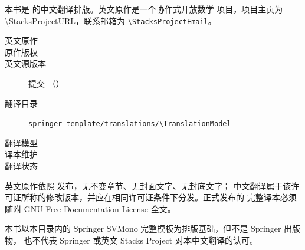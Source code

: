 
\noindent
本书是 \StacksProjectName{} 的中文翻译排版。英文原作是一个协作式开放数学
项目，项目主页为 \url{\StacksProjectURL}，联系邮箱为
\href{mailto:\StacksProjectEmail}{\nolinkurl{\StacksProjectEmail}}。

\begin{description}
  \item[英文原作] \StacksOriginalAuthor
  \item[原作版权] \StacksOriginalCopyright
  \item[英文源版本] 提交 \texttt{\StacksSourceRevision}（\StacksSourceDate）
  \item[翻译目录] \nolinkurl{springer-template/translations/\TranslationModel}
  \item[翻译模型] \TranslationModelName
  \item[译本维护] \TranslationMaintainer
  \item[翻译状态] \TranslationStatus
\end{description}

\noindent
英文原作依照 \StacksLicenseName{} 发布，无不变章节、无封面文字、无封底文字；
中文翻译属于该许可证所称的修改版本，并应在相同许可证条件下分发。正式发布的
完整译本必须随附 GNU Free Documentation License 全文。

\medskip\noindent
\TranslationNotice

\medskip\noindent
本书以本目录内的 Springer SVMono 完整模板为排版基础，但不是 Springer 出版物，
也不代表 Springer 或英文 Stacks Project 对本中文翻译的认可。
